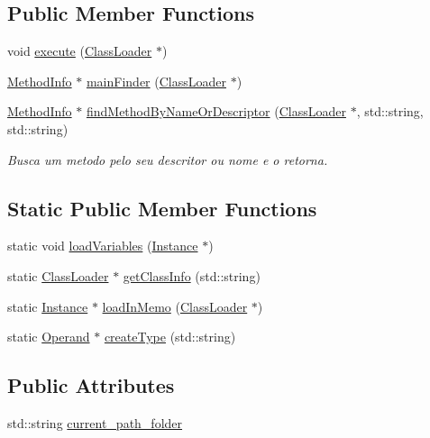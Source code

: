 \subsection*{Public Member Functions}
\begin{DoxyCompactItemize}
\item 
void \hyperlink{class_interpreter_aaa34fcc8ece810597cd2fea359b65220}{execute} (\hyperlink{class_class_loader}{Class\+Loader} $\ast$)
\item 
\hyperlink{struct_method_info}{Method\+Info} $\ast$ \hyperlink{class_interpreter_a9be1f0faf7df7c81dc180da22ea08fa5}{main\+Finder} (\hyperlink{class_class_loader}{Class\+Loader} $\ast$)
\item 
\hyperlink{struct_method_info}{Method\+Info} $\ast$ \hyperlink{class_interpreter_a16752843b70549dac6ed661365e95ae3}{find\+Method\+By\+Name\+Or\+Descriptor} (\hyperlink{class_class_loader}{Class\+Loader} $\ast$, std\+::string, std\+::string)
\begin{DoxyCompactList}\small\item\em Busca um metodo pelo seu descritor ou nome e o retorna. \end{DoxyCompactList}\end{DoxyCompactItemize}
\subsection*{Static Public Member Functions}
\begin{DoxyCompactItemize}
\item 
static void \hyperlink{class_interpreter_a39a3745e54aa3cee8882075c96ae8b3f}{load\+Variables} (\hyperlink{struct_instance}{Instance} $\ast$)
\item 
static \hyperlink{class_class_loader}{Class\+Loader} $\ast$ \hyperlink{class_interpreter_a99a623bb05c66632d0ab034ebaf2cf51}{get\+Class\+Info} (std\+::string)
\item 
static \hyperlink{struct_instance}{Instance} $\ast$ \hyperlink{class_interpreter_ab8fa17a7a73d119f3a3113555aef9702}{load\+In\+Memo} (\hyperlink{class_class_loader}{Class\+Loader} $\ast$)
\item 
static \hyperlink{struct_operand}{Operand} $\ast$ \hyperlink{class_interpreter_a8ff3509dcc0f48200724b8ae04467495}{create\+Type} (std\+::string)
\end{DoxyCompactItemize}
\subsection*{Public Attributes}
\begin{DoxyCompactItemize}
\item 
std\+::string \hyperlink{class_interpreter_aba201f836cc30ebda2cdab362e00a145}{current\+\_\+path\+\_\+folder}
\end{DoxyCompactItemize}
